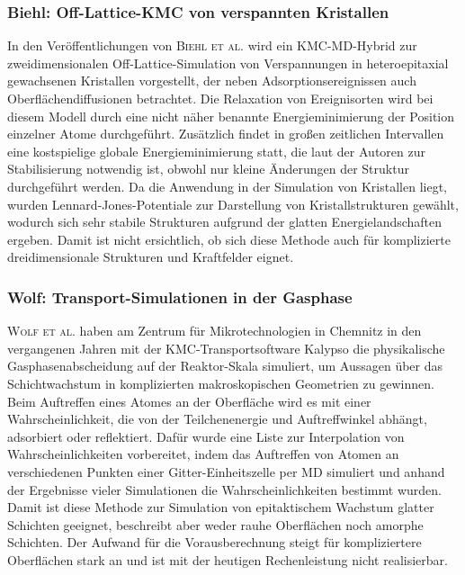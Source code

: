 \subsubsection{Biehl: Off-Lattice-KMC von verspannten Kristallen}
In den Veröffentlichungen von \textsc{Biehl et al.}\cite{biehl_off-lattice_2005} wird ein KMC-MD-Hybrid zur zweidimensionalen Off-Lattice-Simulation von Verspannungen in heteroepitaxial gewachsenen Kristallen vorgestellt, der neben Adsorptionsereignissen auch Oberflächendiffusionen betrachtet.
Die Relaxation von Ereignisorten wird bei diesem Modell durch eine nicht näher benannte Energieminimierung der Position einzelner Atome durchgeführt.
Zusätzlich findet in großen zeitlichen Intervallen eine kostspielige globale Energieminimierung statt, die laut der Autoren zur Stabilisierung notwendig ist, obwohl nur kleine Änderungen der Struktur durchgeführt werden.
Da die Anwendung in der Simulation von Kristallen liegt, wurden Lennard-Jones-Potentiale zur Darstellung von Kristallstrukturen gewählt, wodurch sich sehr stabile Strukturen aufgrund der glatten Energielandschaften ergeben.
Damit ist nicht ersichtlich, ob sich diese Methode auch für komplizierte dreidimensionale Strukturen und Kraftfelder eignet.

\subsubsection{Wolf: Transport-Simulationen in der Gasphase}

\textsc{Wolf et al.}\cite{wolf_investigation_2002,wolf_simulation_2010} haben am Zentrum für Mikrotechnologien in Chemnitz in den vergangenen Jahren mit der KMC-Transportsoftware Kalypso\cite{karolewski_kalypso:_2005} die physikalische Gasphasenabscheidung auf der Reaktor-Skala simuliert, um Aussagen über das Schichtwachstum in komplizierten makroskopischen Geometrien zu gewinnen.
Beim Auftreffen eines Atomes an der Oberfläche wird es mit einer Wahrscheinlichkeit, die von der Teilchenenergie und Auftreffwinkel abhängt, adsorbiert oder reflektiert.
Dafür wurde eine Liste zur Interpolation von Wahrscheinlichkeiten vorbereitet, indem das Auftreffen von Atomen an verschiedenen Punkten einer Gitter-Einheitszelle per MD simuliert und anhand der Ergebnisse vieler Simulationen die Wahrscheinlichkeiten bestimmt wurden.
Damit ist diese Methode zur Simulation von epitaktischem Wachstum glatter Schichten geeignet, beschreibt aber weder rauhe Oberflächen noch amorphe Schichten.
Der Aufwand für die Vorausberechnung steigt für kompliziertere Oberflächen stark an und ist mit der heutigen Rechenleistung nicht realisierbar.

